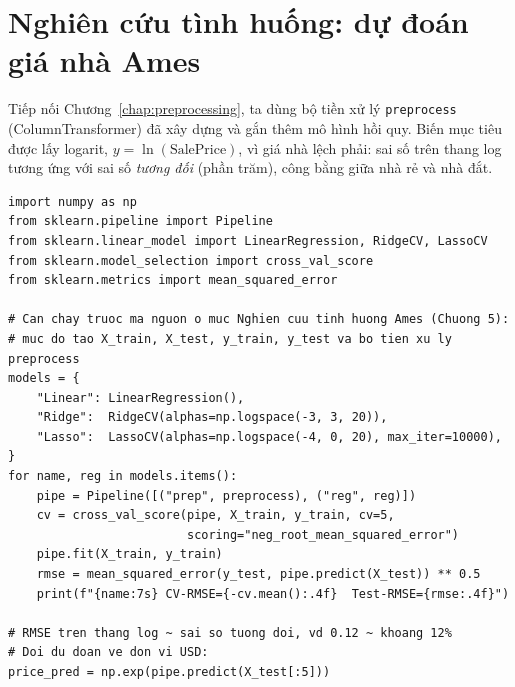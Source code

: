 \section{Nghiên cứu tình huống: dự đoán giá nhà Ames}

Tiếp nối Chương~\ref{chap:preprocessing}, ta dùng bộ tiền xử lý \texttt{preprocess} (ColumnTransformer) đã xây dựng và gắn thêm mô hình hồi quy. Biến mục tiêu được lấy logarit, $y = \ln(\text{SalePrice})$, vì giá nhà lệch phải: sai số trên thang log tương ứng với sai số \textit{tương đối} (phần trăm), công bằng giữa nhà rẻ và nhà đắt.

\begin{lstlisting}[caption={So sánh Linear Regression, Ridge và Lasso trên Ames Housing}]
import numpy as np
from sklearn.pipeline import Pipeline
from sklearn.linear_model import LinearRegression, RidgeCV, LassoCV
from sklearn.model_selection import cross_val_score
from sklearn.metrics import mean_squared_error

# Can chay truoc ma nguon o muc Nghien cuu tinh huong Ames (Chuong 5):
# muc do tao X_train, X_test, y_train, y_test va bo tien xu ly preprocess
models = {
    "Linear": LinearRegression(),
    "Ridge":  RidgeCV(alphas=np.logspace(-3, 3, 20)),
    "Lasso":  LassoCV(alphas=np.logspace(-4, 0, 20), max_iter=10000),
}
for name, reg in models.items():
    pipe = Pipeline([("prep", preprocess), ("reg", reg)])
    cv = cross_val_score(pipe, X_train, y_train, cv=5,
                         scoring="neg_root_mean_squared_error")
    pipe.fit(X_train, y_train)
    rmse = mean_squared_error(y_test, pipe.predict(X_test)) ** 0.5
    print(f"{name:7s} CV-RMSE={-cv.mean():.4f}  Test-RMSE={rmse:.4f}")

# RMSE tren thang log ~ sai so tuong doi, vd 0.12 ~ khoang 12%
# Doi du doan ve don vi USD:
price_pred = np.exp(pipe.predict(X_test[:5]))
\end{lstlisting}


